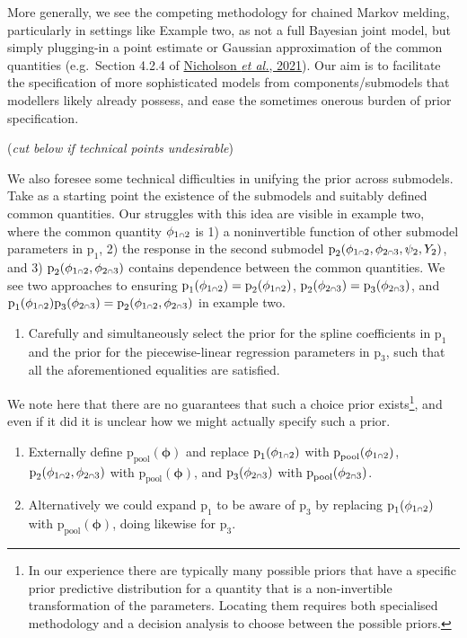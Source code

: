 \documentclass[
  10pt,
  a4paper,
]{article}
\providecommand{\tightlist}{%
  \setlength{\itemsep}{0pt}\setlength{\parskip}{0pt}}
\let\Oldcap\cap
\renewcommand{\cap}{\mathrel{\mathsmaller{\Oldcap}}}
\newcommand{\pd}{\text{p}}
\begin{document}
More generally, we see the competing methodology for chained Markov
melding, particularly in settings like Example two, as not a full
Bayesian joint model, but simply plugging-in a point estimate or
Gaussian approximation of the common quantities (e.g.~Section 4.2.4 of
\protect\hyperlink{ref-nicholson_interoperability_2021}{Nicholson
\emph{et al.}, 2021}). Our aim is to facilitate the specification of
more sophisticated models from components/submodels that modellers
likely already possess, and ease the sometimes onerous burden of prior
specification.

(\emph{cut below if technical points undesirable})

We also foresee some technical difficulties in unifying the prior across
submodels. Take as a starting point the existence of the submodels and
suitably defined common quantities. Our struggles with this idea are
visible in example two, where the common quantity \(\phi_{1 \cap 2}\) is
1) a noninvertible function of other submodel parameters in \(\pd_{1}\),
2) the response in the second submodel
\(\pd_{2}(\phi_{1 \cap 2}, \phi_{2 \cap 3}, \psi_{2}, Y_{2})\), and 3)
\(\pd_{2}(\phi_{1 \cap 2}, \phi_{2 \cap 3})\) contains dependence
between the common quantities. We see two approaches to ensuring
\(\pd_{1}(\phi_{1 \cap 2}) = \pd_{2}(\phi_{1 \cap 2})\),
\(\pd_{2}(\phi_{2 \cap 3}) = \pd_{3}(\phi_{2 \cap 3})\), and
\(\pd_{1}(\phi_{1 \cap 2})\pd_{3}(\phi_{2 \cap 3}) = \pd_{2}(\phi_{1 \cap 2}, \phi_{2 \cap 3})\)
in example two.

\begin{enumerate}
\def\labelenumi{\arabic{enumi}.}
\tightlist
\item
  Carefully and simultaneously select the prior for the spline
  coefficients in \(\pd_{1}\) and the prior for the piecewise-linear
  regression parameters in \(\pd_{3}\), such that all the aforementioned
  equalities are satisfied.
\end{enumerate}

We note here that there are no guarantees that such a choice prior
exists\footnote{In our experience there are typically many possible
  priors that have a specific prior predictive distribution for a
  quantity that is a non-invertible transformation of the parameters.
  Locating them requires both specialised methodology and a decision
  analysis to choose between the possible priors.}, and even if it did
it is unclear how we might actually specify such a prior.

\begin{enumerate}
\def\labelenumi{\arabic{enumi}.}
\setcounter{enumi}{1}
\tightlist
\item
  Externally define \(\pd_{\text{pool}}(\boldsymbol{\phi})\) and replace
  \(\pd_{1}(\phi_{1 \cap 2})\) with
  \(\pd_{\text{pool}}(\phi_{1 \cap 2})\),
  \(\pd_{2}(\phi_{1 \cap 2}, \phi_{2 \cap 3})\) with
  \(\pd_{\text{pool}}(\boldsymbol{\phi})\), and
  \(\pd_{3}(\phi_{2 \cap 3})\) with
  \(\pd_{\text{pool}}(\phi_{2 \cap 3})\).
\item
  Alternatively we could expand \(\pd_{1}\) to be aware of \(\pd_{3}\)
  by replacing \(\pd_{1}(\phi_{1 \cap 2})\) with
  \(\pd_{\text{pool}}(\boldsymbol{\phi})\), doing likewise for
  \(\pd_{3}\).
\end{enumerate}
\end{document}
